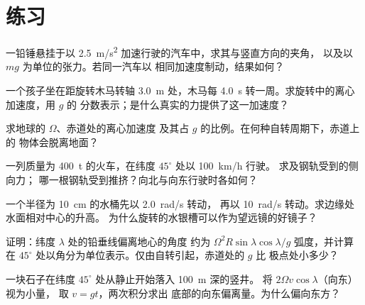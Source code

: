 \section{练习}

\begin{exercise}[$\star$]\label{exo:b1:non-inertial-frames:1}
一铅锤悬挂于以 \qty{2.5}{m/s^2} 加速行驶的汽车中，求其与竖直方向的夹角，
以及以 $mg$ 为单位的张力。若同一汽车以
相同加速度制动，结果如何？
\end{exercise}

\begin{exercise}[$\star$]\label{exo:b1:non-inertial-frames:2}
一个孩子坐在距旋转木马转轴 \qty{3.0}{m} 处，木马每
\qty{4.0}{s} 转一周。求旋转中的离心加速度，用 $g$ 的
分数表示；是什么真实的力提供了这一加速度？
\end{exercise}

\begin{exercise}[$\star$]\label{exo:b1:non-inertial-frames:3}
求地球的 $\Omega$、赤道处的离心加速度
及其占 $g$ 的比例。在何种自转周期下，赤道上的
物体会脱离地面？
\end{exercise}

\begin{exercise}[$\star$]\label{exo:b1:non-inertial-frames:4}
一列质量为 \qty{400}{t} 的火车，在纬度 $45^\circ$ 处以 \qty{100}{km/h} 行驶。
求及钢轨受到的侧向力；
哪一根钢轨受到推挤？向北与向东行驶时各如何？
\end{exercise}

\begin{exercise}[$\star\star$]\label{exo:b1:non-inertial-frames:5}
一个半径为 \qty{10}{cm} 的水桶先以 \qty{2.0}{rad/s} 转动，
再以 \qty{10}{rad/s} 转动。求边缘处水面相对中心的升高。
为什么旋转的水银槽可以作为望远镜的好镜子？
\end{exercise}

\begin{exercise}[$\star\star$]\label{exo:b1:non-inertial-frames:6}
证明：纬度 $\lambda$ 处的铅垂线偏离地心的角度
约为 $\Omega^2R\sin\lambda\cos\lambda/g$ 弧度，并计算
在 $45^\circ$ 处以角分为单位表示。仅由自转引起，赤道处的 $g$ 比
极点处小多少？
\end{exercise}

\begin{exercise}[$\star\star$]\label{exo:b1:non-inertial-frames:7}
一块石子在纬度 $45^\circ$ 处从静止开始落入 \qty{100}{m} 深的竖井。
将 $2\Omega v\cos\lambda$（向东）视为小量，
取 $v = gt$，两次积分求出
底部的向东偏离量。为什么偏向东方？
\end{exercise}

